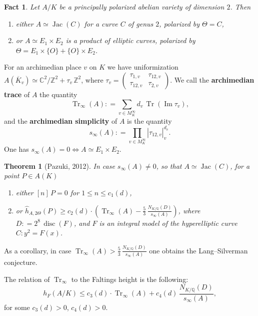 \documentclass{article}
\newtheorem{fact}[proposition]{Fact}
\newtheorem{theorem}[proposition]{Theorem}
\theoremstyle{definition}
\renewcommand{\Im}{\mathop{\mathrm{Im}}}
\DeclareMathOperator{\Tr}{Tr}
\DeclareMathOperator{\Jac}{Jac}
\DeclareMathOperator{\disc}{disc}
\newcommand{\isom}{\simeq}
\newcommand{\term}{\textbf}
\newcommand{\dfn}{\mathrel{\mathop:}=}
\newcommand{\ZZ}{\mathbb{Z}}
\newcommand{\QQ}{\mathbb{Q}}
\newcommand{\CC}{\mathbb{C}}
\begin{document}
\begin{fact}
  Let $A/K$ be a principally polarized abelian variety of dimension $2$. Then
  \begin{enumerate}
  \item[(1)] either $A \isom \Jac (C)$ for a curve $C$ of genus $2$, polarized
    by $\Theta = C$,

  \item[(2)] or $A \isom E_1\times E_2$ is a product of elliptic curves,
    polarized by $\Theta = E_1\times \{ O \} + \{ O \} \times E_2$.
  \end{enumerate}
\end{fact}

For an archimedian place $v$ on $K$ we have uniformization
$A (\overline{K}_v) \isom \CC^2/\ZZ^2 + \tau_v \, \ZZ^2$, where
$\tau_v = \begin{pmatrix}
  \tau_{1,v} & \tau_{12,v} \\
  \tau_{12,v} & \tau_{2,v}
\end{pmatrix}$.
We call the \term{archimedian trace} of $A$ the quantity
$$\Tr_\infty (A) \dfn \sum_{v \in M_K^\infty} d_v \, \Tr (\Im \tau_v),$$
and the \term{archimedian simplicity} of $A$ is the quantity
$$s_\infty (A) \dfn \prod_{v\in M_K^\infty} |\tau_{12,v}|_v^{d_v}.$$
One has $s_\infty (A) = 0 \iff A\isom E_1\times E_2$.

\begin{theorem}[Pazuki, 2012]
  In case $s_\infty (A) \ne 0$, so that $A \isom \Jac (C)$, for a point
  $P \in A(K)$

  \begin{enumerate}
  \item[(1)] either $[n]\,P = 0$ for $1 \le n \le c_1 (d)$,

  \item[(2)] or $\widehat{h}_{A,2\Theta} (P) \ge c_2 (d) \cdot \left(\Tr_\infty (A) - \frac{5}{3} \, \frac{N_{K/\QQ} (D)}{s_\infty (A)}\right)$,
    where $D\dfn 2^8 \, \disc (F)$, and $F$ is an integral model of the
    hyperelliptic curve $C\colon y^2 = F (x)$.
  \end{enumerate}
\end{theorem}

As a corollary, in case
$\Tr_\infty (A) > \frac{5}{3} \, \frac{N_{K/\QQ} (D)}{s_\infty (A)}$ one obtains
the Lang--Silverman conjecture.

The relation of $\Tr_\infty$ to the Faltings height is the following:
$$h_F (A/K) \le c_3 (d) \cdot \Tr_\infty (A) + c_4 (d)\,\frac{N_{K/\QQ} (D)}{s_\infty (A)},$$
for some $c_3 (d) > 0$, $c_4 (d) > 0$.
\end{document}

